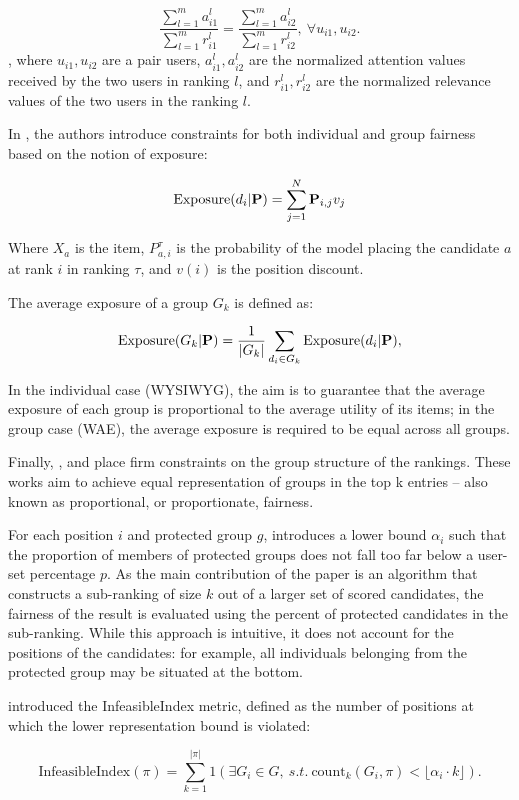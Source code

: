 $$
  \frac{\sum_{l=1}^{m} a^l_{i1}}{\sum_{l=1}^{m} r^l_{i1}} 
= \frac{\sum_{l=1}^{m} a^l_{i2}} {\sum_{l=1}^{m} r^l_{i2}},\ \forall u_{i1}, u_{i2}.
$$,
where $u_{i1}, u_{i2}$ are a pair users, $a^l_{i1}, a^l_{i2}$ are the normalized attention values received by the two users in ranking $l$, and $r^l_{i1}, r^l_{i2}$ are the normalized relevance values of the two users in the ranking $l$.

In \cite{FairnessofExposureSJ}, the authors introduce constraints for both individual and group fairness based on the notion of exposure:

\[
\textrm{Exposure}(d_i|\mathbf{P}) = \sum_{j=1}^N \mathbf{P}_{i,j} v_j
\]


Where $X_a$ is the item, $P_{a,i}^{\tau}$ is the probability of the model placing the candidate $a$ at rank $i$ in ranking $\tau$, and $v(i)$ is the position discount.

The average exposure of a group $G_k$ is defined as:

\[
\textrm{Exposure}(G_k|\mathbf{P})=\frac{1}{|G_k|}\sum_{d_i \in G_k} \textrm{Exposure}(d_i|\mathbf{P}),
\]

In the individual case (WYSIWYG), the aim is to guarantee that the average exposure of each group is proportional to the average utility of its items; in the group case (WAE), the average exposure is required to be equal across all groups.

Finally, \cite{fair}, \cite{linkedin} and \cite{RAPF} place firm constraints on the group structure of the rankings. These works aim to achieve equal representation of groups in the top k entries – also known as proportional, or proportionate, fairness.

For each position $i$ and protected group $g$, \cite{fair} introduces a lower bound $\alpha_i$ such that the proportion of members of protected groups does not fall too far below a user-set percentage $p$. As the main contribution of the paper is an algorithm that constructs a sub-ranking of size $k$ out of a larger set of scored candidates, the fairness of the result is evaluated using the percent of protected candidates in the sub-ranking. While this approach is intuitive, it does not account for the positions of the candidates: for example, all individuals belonging from the protected group may be situated at the bottom.

\cite{linkedin} introduced the InfeasibleIndex metric, defined as the number of positions at which the lower representation bound is violated:

\begin{equation}
\label{eq:infeasible_index}
\textrm{InfeasibleIndex}(\pi) = \sum_{k=1}^{|\pi|} 1{(\exists G_i \in G, ~s.t. ~ \text{count}_k(G_i, \pi) < \lfloor \alpha_i \cdot k \rfloor)}.
\end{equation}

